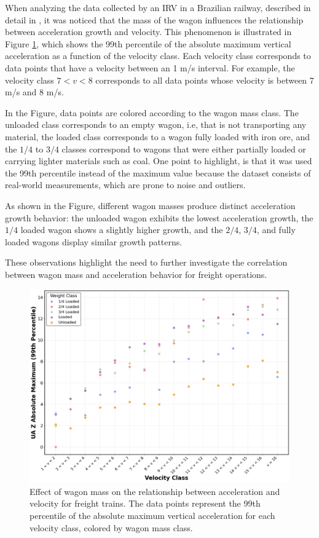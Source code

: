 When analyzing the data collected by an IRV in a Brazilian railway, described in detail in \cite{PIRES2024107191}, it was noticed that the mass of the wagon influences the relationship between acceleration growth and velocity. This phenomenon is illustrated in Figure \ref{fig:mass_effect}, which shows the 99th percentile of the absolute maximum vertical acceleration as a function of the velocity class. Each velocity class corresponds to data points that have a velocity between an 1 m/s interval. For example, the velocity class $7 < v < 8$ corresponds to all data points whose velocity is between 7 m/s and 8 m/s.

In the Figure, data points are colored according to the wagon mass class. The unloaded class corresponds to an empty wagon, i.e, that is not transporting any material, the loaded class corresponds to a wagon fully loaded with iron ore, and the $1/4$ to $3/4$ classes correspond to wagons that were either partially loaded or carrying lighter materials such as coal. One point to highlight, is that it was used the 99th percentile instead of the maximum value because the dataset consists of real-world measurements, which are prone to noise and outliers.

As shown in the Figure, different wagon masses produce distinct acceleration growth behavior: the unloaded wagon exhibits the lowest acceleration growth, the $1/4$ loaded wagon shows a slightly higher growth, and the $2/4$, $3/4$, and fully loaded wagons display similar growth patterns.

These observations highlight the need to further investigate the correlation between wagon mass and acceleration behavior for freight operations.

\begin{figure}[H]
    \centering
    \includegraphics[width=12cm]{Cap2_LitReview/Mass_effect/Mass_effect.jpg}
    \caption{Effect of wagon mass on the relationship between acceleration and velocity for freight trains. The data points represent the 99th percentile of the absolute maximum vertical acceleration for each velocity class, colored by wagon mass class.}
    \label{fig:mass_effect}
\end{figure}

